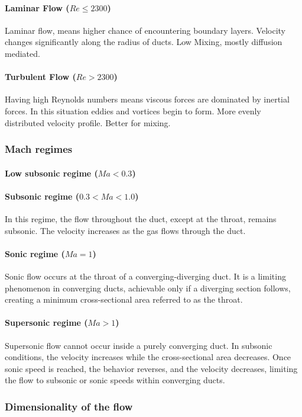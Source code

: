 \paragraph{Laminar Flow (\(Re \le 2300\))}
Laminar flow, means higher chance of encountering boundary layers. Velocity changes significantly along the radius of ducts. Low Mixing, mostly diffusion mediated.

\paragraph{Turbulent Flow (\(Re > 2300\))}
Having high Reynolds numbers means viscous forces are dominated by inertial forces. In this situation eddies and vortices begin to form. More evenly distributed velocity profile. Better for mixing. 

\newpage
\subsubsection{Mach regimes}

\paragraph{Low subsonic regime (\(Ma < 0.3\))}

\paragraph{Subsonic regime (\(0.3 < Ma < 1.0\))} 
In this regime, the flow throughout the duct, except at the throat, remains subsonic. The velocity increases as the gas flows through the duct.\\
\paragraph{Sonic regime (\(Ma = 1\))} 
Sonic flow occurs at the throat of a converging-diverging duct. It is a limiting phenomenon in converging ducts, achievable only if a diverging section follows, creating a minimum cross-sectional area referred to as the throat.

\paragraph{Supersonic regime (\(Ma > 1\))} 
Supersonic flow cannot occur inside a purely converging duct. In subsonic conditions, the velocity increases while the cross-sectional area decreases. Once sonic speed is reached, the behavior reverses, and the velocity decreases, limiting the flow to subsonic or sonic speeds within converging ducts.\\


\newpage
\subsubsection{Dimensionality of the flow}
